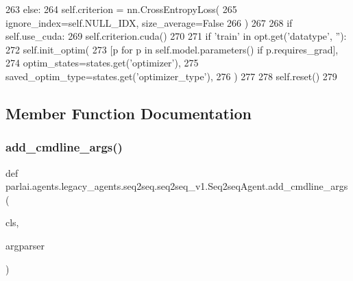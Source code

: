\begin{DoxyCode}
263         \textcolor{keywordflow}{else}:
264             self.criterion = nn.CrossEntropyLoss(
265                 ignore\_index=self.NULL\_IDX, size\_average=\textcolor{keyword}{False}
266             )
267 
268         \textcolor{keywordflow}{if} self.use\_cuda:
269             self.criterion.cuda()
270 
271         \textcolor{keywordflow}{if} \textcolor{stringliteral}{'train'} \textcolor{keywordflow}{in} opt.get(\textcolor{stringliteral}{'datatype'}, \textcolor{stringliteral}{''}):
272             self.init\_optim(
273                 [p \textcolor{keywordflow}{for} p \textcolor{keywordflow}{in} self.model.parameters() \textcolor{keywordflow}{if} p.requires\_grad],
274                 optim\_states=states.get(\textcolor{stringliteral}{'optimizer'}),
275                 saved\_optim\_type=states.get(\textcolor{stringliteral}{'optimizer\_type'}),
276             )
277 
278         self.reset()
279 
\end{DoxyCode}


\subsection{Member Function Documentation}
\mbox{\label{classparlai_1_1agents_1_1legacy__agents_1_1seq2seq_1_1seq2seq__v1_1_1Seq2seqAgent_a2f5c66732d78976428b26b96f14b311b}} 
\subsubsection{\texorpdfstring{add\+\_\+cmdline\+\_\+args()}{add\_cmdline\_args()}}
{\footnotesize\ttfamily def parlai.\+agents.\+legacy\+\_\+agents.\+seq2seq.\+seq2seq\+\_\+v1.\+Seq2seq\+Agent.\+add\+\_\+cmdline\+\_\+args (\begin{DoxyParamCaption}\item[{}]{cls,  }\item[{}]{argparser }\end{DoxyParamCaption})}

